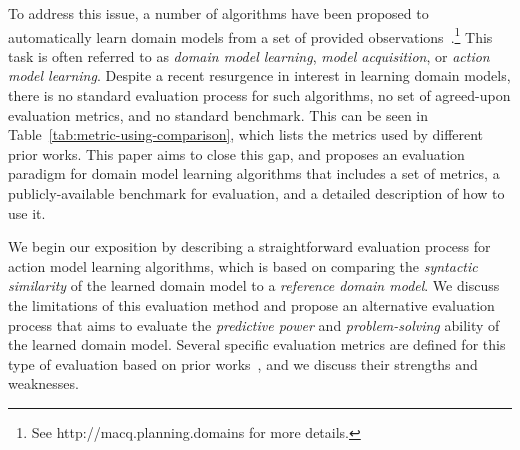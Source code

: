 \documentclass{article}
\theoremstyle{definition}
\theoremstyle{remark}
\newif\ifaddcomments
\newcommand{\roni}[1]{\ifaddcomments{\textcolor{red}{[Roni: #1]}}\fi}
\newcommand{\yarin}[1]{\ifaddcomments{\textcolor{teal}{[Yarin: #1]}}\fi}
\newcommand{\cm}[1]{\ifaddcomments{\textcolor{olive}{[Christian: #1]}}\fi}
\begin{document}
To address this issue, a number of algorithms have been proposed to automatically learn domain models from a set of provided observations~\citep{macq,aineto2019learning,jimenez2012review}.\footnote{See http://macq.planning.domains for more details.} 
This task is often referred to as \emph{domain model learning}, \emph{model acquisition}, or \emph{action model learning}. 
Despite a recent resurgence in interest in learning domain models, there is no standard evaluation process for such algorithms, no set of agreed-upon evaluation metrics, and no standard benchmark. This can be seen in Table~\ref{tab:metric-using-comparison}, which lists the metrics used by different prior works. 
This paper aims to close this gap, and proposes an evaluation paradigm for domain model learning algorithms that includes a set of metrics, a publicly-available benchmark for evaluation, and a detailed description of how to use it. 







We begin our exposition by describing a straightforward evaluation process for action model learning algorithms, which is based on comparing the \emph{syntactic similarity} of the learned domain model to a \emph{reference domain model}. We discuss the limitations of this evaluation method and propose an alternative evaluation process that aims to evaluate the \emph{predictive power} and \emph{problem-solving} ability of the learned domain model. 
Several specific evaluation metrics are defined for this type of evaluation based on prior works~\citep{aineto2019learning,juba2021safe,mordoch2024safe,Oswald2024DLLMDomainModeling}, and we discuss their strengths and weaknesses. 
\end{document}
